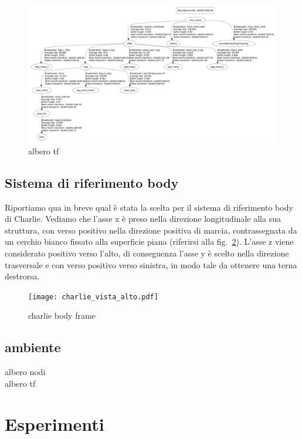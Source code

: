 \begin{figure}
	\centering    
	\includegraphics[height=.4\textheight]{tf_tree.pdf}
	\caption{albero tf}
	\label{fig: albero tf}
\end{figure}

\subsection{Sistema di riferimento body}
Riportiamo qua in breve qual è stata la scelta per il sistema di riferimento body di Charlie. Vediamo che l'asse x è
preso nella direzione longitudinale alla sua struttura, con verso positivo nella direzione positiva di marcia, contrassegnata
da un cerchio bianco fissato alla superficie piana (riferirsi alla fig.~\ref{fig: charlie body frame}). L'asse z viene considerato 
positivo verso l'alto, di conseguenza l'asse y è scelto nella direzione trasversale e con verso positivo verso sinistra, in modo tale
da ottenere una terna destrorsa.
\begin{figure}[] 
	\centering    
	\texttt{[image: charlie\_vista\_alto.pdf]}
	\caption{charlie body frame}
	\label{fig: charlie body frame}
\end{figure}

\subsection{ambiente}
albero nodi\\
albero tf\\
\section{Esperimenti}

